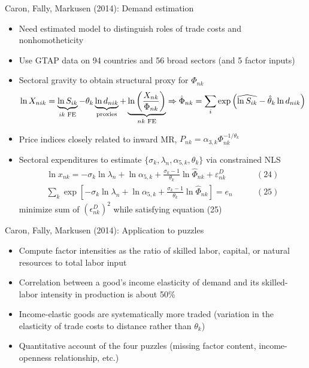 \documentclass[11pt,notes=hide,aspectratio=169]{beamer}
\begin{document}
\begin{frame}{Caron, Fally, Markusen (2014): Demand estimation}
\linespread{1.0}
\begin{itemize}
	\item Need estimated model to distinguish roles of trade costs and nonhomotheticity
	\item Use GTAP data on 94 countries and 56 broad sectors (and 5 factor inputs)
	\item Sectoral gravity to obtain structural proxy for $\Phi_{nk}$
	\begin{equation*}
	\ln X_{nik} = \underbrace{\ln S_{ik}}_{ik \textnormal{ FE}} - \theta_k \underbrace{\ln d_{nik}}_{\textnormal{proxies}} + \underbrace{\ln\left(\frac{X_{nk}}{\Phi_{nk}} \right)}_{nk \textnormal{ FE}}
	\Rightarrow
	\hat{\Phi}_{nk} = \sum_i \exp \left( \widehat{\ln S_{ik}} - \hat{\theta}_k \ln d_{nik} \right)
	\end{equation*}
	\item Price indices closely related to inward MR, $P_{nk} = \alpha_{3,k} \Phi_{nk}^{-1/\theta_k}$
	\item Sectoral expenditures to estimate $\{\sigma_k, \lambda_n, \alpha_{5,k}, \theta_k\}$ via constrained NLS
	\begin{align*}
	\ln x_{nk} = {-\sigma_k}\ln \lambda_n + \ln \alpha_{5,k} + \frac{\sigma_k-1}{\theta_k} \ln \hat{\Phi}_{nk} + \varepsilon_{nk}^{D} 
	& \qquad (24)
	\\
	\sum_k \exp \left[ {-\sigma_k}\ln \lambda_n + \ln \alpha_{5,k} + \frac{\sigma_k-1}{\theta_k} \ln \hat{\Phi}_{nk} \right] = e_n
	& \qquad (25)
	\end{align*}
	minimize sum of $(\epsilon_{nk}^{D})^{2}$ while satisfying equation (25)
\end{itemize}
\end{frame}
\begin{frame}{Caron, Fally, Markusen (2014): Application to puzzles}
\begin{itemize}
	\item Compute factor intensities as the ratio of skilled labor, capital, or natural resources to total labor input
	\item Correlation between a good's income elasticity of demand and its skilled-labor intensity in production is about 50\%
	\item Income-elastic goods are systematically more traded (variation in the elasticity of trade costs to distance rather than $\theta_k$)
	\item Quantitative account of the four puzzles (missing factor content, income-openness relationship, etc.)
\end{itemize}
\end{frame}
\end{document}
